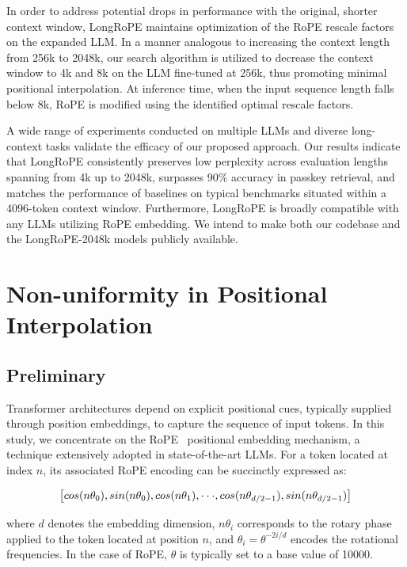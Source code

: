 In order to address potential drops in performance with the original, shorter context window, {LongRoPE} maintains optimization of the RoPE rescale factors on the expanded LLM. In a manner analogous to increasing the context length from 256k to 2048k, our search algorithm is utilized to decrease the context window to 4k and 8k on the LLM fine-tuned at 256k, thus promoting minimal positional interpolation. At inference time, when the input sequence length falls below 8k, RoPE is modified using the identified optimal rescale factors.

A wide range of experiments conducted on multiple LLMs and diverse long-context tasks validate the efficacy of our proposed approach. Our results indicate that LongRoPE consistently preserves low perplexity across evaluation lengths spanning from 4k up to 2048k, surpasses 90\% accuracy in passkey retrieval, and matches the performance of baselines on typical benchmarks situated within a 4096-token context window. Furthermore, LongRoPE is broadly compatible with any LLMs utilizing RoPE embedding. We intend to make both our codebase and the LongRoPE-2048k models publicly available.

\section{Non-uniformity in Positional Interpolation}
\label{sec:analysis}

\subsection{Preliminary}

Transformer architectures depend on explicit positional cues, typically supplied through position embeddings, to capture the sequence of input tokens. In this study, we concentrate on the RoPE~\cite{rope} positional embedding mechanism, a technique extensively adopted in state-of-the-art LLMs. For a token located at index $n$, its associated RoPE encoding can be succinctly expressed as:

\begin{equation}
		\fontsize{7.8}{7.8} \selectfont
	\label{eq:rope}
	\left[ cos(n\theta_0), sin(n\theta_0), cos(n\theta_1), \cdot\cdot\cdot, cos(n\theta_{d/2-1}), sin(n\theta_{d/2-1}) \right]   
\end{equation}

where $d$ denotes the embedding dimension, $n\theta_i$ corresponds to the rotary phase applied to the token located at position $n$, and $\theta_i=\theta^{-2i/d}$ encodes the rotational frequencies. In the case of RoPE, $\theta$ is typically set to a base value of 10000.

